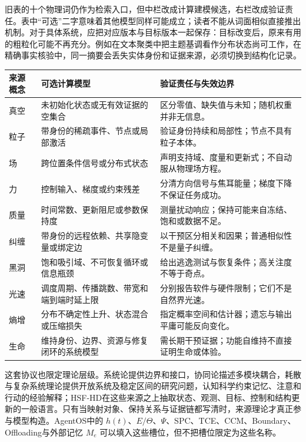 旧表的十个物理词仍作为检索入口，但中栏改成计算建模候选，右栏改成验证责任。表中“可选”二字意味着其他模型同样可能成立；读者不能从词面相似直接推出机制。对于具体系统，应把对应版本与目标版本一起保存：目标改变后，原来有用的粗粒化可能不再充分。例如在文本聚类中把主题基调看作分布状态尚可工作，在精确事实核验中，同一摘要会丢失实体身份和证据来源，必须切换到结构化记录。

\begin{table}[htbp]
\centering
\footnotesize
\begin{tabularx}{\textwidth}{l X X}
\toprule
\rowcolor{structurecolor!20} 来源概念 & 可选计算模型 & 验证责任与失效边界 \\
\midrule
真空 & 未初始化状态或无有效证据的空集合 & 区分零值、缺失值与未知；随机权重并非无信息。 \\
粒子 & 带身份的稀疏事件、节点或局部激活 & 验证身份持续和局部性；节点不具有粒子本体。 \\
场 & 跨位置条件信号或分布式状态 & 声明支持域、度量和更新式；不自动服从物理场方程。 \\
力 & 控制输入、梯度或约束残差 & 分清方向信号与焦耳能量；梯度下降不保证任务成功。 \\
质量 & 时间常数、更新阻尼或参数保持度 & 测量扰动响应；保持可能来自冻结、饱和或数据不足。 \\
纠缠 & 带身份的远程依赖、共享隐变量或绑定边 & 以干预区分相关和因果；普通相似性不是量子纠缠。 \\
黑洞 & 饱和吸引域、不可恢复循环或信息瓶颈 & 给出逃逸测试与恢复条件；高关注度不等于奇点。 \\
光速 & 调度周期、传播跳数、带宽和端到端时延上限 & 分别报告软件与硬件限制；它们不是自然界光速。 \\
熵增 & 分布不确定性上升、状态混合或压缩损失 & 指定概率空间和估计器；遗忘与输出平庸可能反向变化。 \\
生命 & 维持身份、边界、资源与修复闭环的系统模型 & 需长期干预证据；功能自维持不直接证明生命或体验。 \\
\bottomrule
\end{tabularx}
\end{table}

这套协议也限定理论层级。系统论提供边界和接口，协同论描述多模块耦合，耗散与复杂系统理论提供开放系统及稳定区间的研究问题，认知科学约束记忆、注意和行动的经验解释；HSF-HD在这些来源之上抽取状态、观测、目标、控制和结构更新的一般语言。只有当映射对象、保持关系与证据链都写清时，来源理论才真正参与模型构造。AgentOS中的 $h(t)$、$E/\Theta$、$\Psi$、SPC、TCE、CCM、Boundary、Offloading与外部记忆 $M_e$ 可以填入这些槽位，但不把槽位限定为这些名称。

